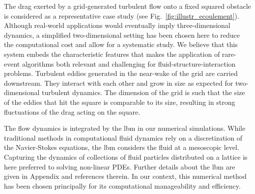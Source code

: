 \documentclass[pre,aps,floatfix,10pt,superscriptaddress, notitlepage,preprint]{revtex4-1}
\begin{document}
%
The drag exerted by a grid-generated turbulent flow onto a fixed squared obstacle is considered as a representative case study (see Fig.~\ref{fig:illustr_ecoulement}). 
%
Although real-world applications would eventually imply three-dimensional dynamics, a simplified two-dimensional setting has been chosen here to reduce the computational cost and allow for a systematic study. 
% 
We believe that this system embeds the characteristic features that makes the application of rare-event algorithms both relevant and challenging for fluid-structure-interaction problems. 
%
Turbulent eddies generated in the near-wake of the grid are carried downstream.
They interact with each other and grow in size as expected for two-dimensional turbulent dynamics. 
The dimension of the grid is such that the size of the eddies that hit the square is comparable to its size, resulting in strong fluctuations of the drag acting on the square. 
%
%
%

%
The flow dynamics is integrated by the \ac{lbm} in our numerical simulations. 
While traditional methods in computational fluid dynamics rely on a discretization of the Navier-Stokes equations, the \ac{lbm} considers the fluid at a mesoscopic level.
Capturing the dynamics of collections of fluid particles distributed on a lattice is here preferred to solving non-linear PDEs. 
Further details about the \ac{lbm} are given in Appendix and references therein.
In our context, this numerical method has been chosen principally for its computational manageability and efficiency. 
\end{document}
